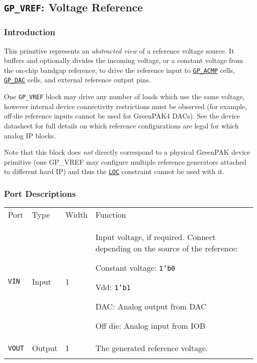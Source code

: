 \documentclass[11pt]{article}
\newcommand{\tokenstyle}[1]{\texttt{#1}}
\newcommand{\datastyle}[1]{\texttt{#1}}
\newcommand{\whenstyle}[1]{{\fontseries{sb}\selectfont#1}}
\newcommand{\tokenref}[2]{\hyperref[#2]{\tokenstyle{#1}}}
\newcommand{\thinhline}{\Xhline{1\arrayrulewidth}}
\newcommand{\thickhline}{\Xhline{2.5\arrayrulewidth}}
\newcommand{\novspace}{\vspace*{-\baselineskip}}
\begin{document}

\pagebreak
\subsection{\tokenstyle{GP\_VREF}: Voltage Reference}
\label{gp-vref}

\subsubsection{Introduction}
This primitive represents an \textit{abstracted view} of a reference voltage source. It buffers and optionally divides 
the incoming voltage, or a constant voltage from the on-chip bandgap reference, to drive the reference input to 
\tokenref{GP\_ACMP}{gp-acmp} cells, \tokenref{GP\_DAC}{gp-dac} cells, and external reference output pins.

One \tokenstyle{GP\_VREF} block may drive any number of loads which use the same voltage, however internal device 
connectivity restrictions must be observed (for example, off-die reference inputs cannot be used for GreenPAK4 DACs). 
See the device datasheet for full details on which reference configurations are legal for which analog IP blocks.

Note that this block does \textit{not} directly correspond to a physical GreenPAK device primitive (one GP\_VREF may 
configure multiple reference generators attached to different hard IP) and thus the \tokenref{LOC}{constraint-loc} 
constraint cannot be used with it.

\subsubsection{Port Descriptions}

\begin{tabularx}{\textwidth}{lllX}
\thinhline
\whenstyle{Port} & \whenstyle{Type} & \whenstyle{Width} & \whenstyle{Function} \\
\thickhline
\tokenstyle{VIN} & Input & 1 & Input voltage, if required. Connect depending on the source of the reference:
	\begin{compactitem}
		\item Constant voltage: \datastyle{1'b0}
		\item Vdd: \datastyle{1'b1}
		\item DAC: Analog output from DAC
		\item Off die: Analog input from IOB\novspace
	\end{compactitem}
\\
\thinhline
\tokenstyle{VOUT} & Output & 1 & The generated reference voltage. \\
\thinhline
\end{tabularx}
\end{document}
